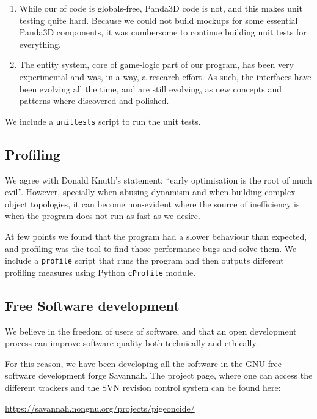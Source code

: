 \documentclass[a4paper,10pt]{article}
\begin{document}
\begin{enumerate}
\item While our of code is globals-free, Panda3D code is not, and this
  makes unit testing quite hard. Because we could not build mockups
  for some essential Panda3D components, it was cumbersome to continue
  building unit tests for everything.

\item The entity system, core of game-logic part of our program, has
  been very experimental and was, in a way, a research effort. As
  such, the interfaces have been evolving all the time, and are still
  evolving, as new concepts and patterns where discovered and
  polished.
\end{enumerate}

We include a \texttt{unittests} script to run the unit tests.

\subsection{Profiling}

We agree  with Donald Knuth's  statement: ``early optimisation  is the
root of much evil''\cite{knuth74structured}. However, specially when
abusing dynamism and when building complex object topologies, it can
become non-evident where the source of inefficiency is when the
program does not run as fast as we desire.

At few points we found that the program had a slower behaviour than
expected, and profiling was the tool to find those performance bugs
and solve them. We include a \texttt{profile} script that runs the
program and then outputs different profiling measures
using Python \texttt{cProfile} module.


\subsection{Free Software development}

We believe in the freedom of users of software, and that an open
development process can improve software quality both technically and
ethically.

For this reason, we have been developing all the software in the GNU
free software development forge Savannah. The project page, where one
can access the different trackers and the SVN revision control system
can be found here:

\url{https://savannah.nongnu.org/projects/pigeoncide/}
\end{document}
